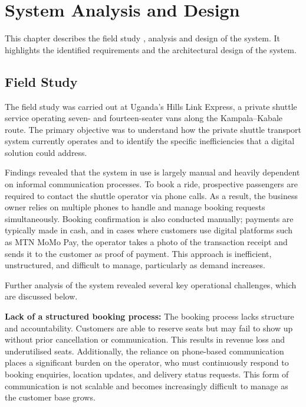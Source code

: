 \chapter{System Analysis and Design}
\label{chap:system_analysis_design}

This chapter describes the field study , analysis and design of the system. It highlights the identified requirements and the architectural design of the system.

\section{Field Study}

The field study was carried out at Uganda's Hills Link Express, a private shuttle service
operating seven- and fourteen-seater vans along the Kampala--Kabale route. The
primary objective was to understand how the private shuttle transport system
currently operates and to identify the specific inefficiencies that a digital
solution could address.



Findings revealed that the system in use is largely manual and heavily dependent
on informal communication processes. To book a ride, prospective passengers are
required to contact the shuttle operator via phone calls. As a result, the
business owner relies on multiple phones to handle and manage booking requests
simultaneously. Booking confirmation is also conducted manually; payments are
typically made in cash, and in cases where customers use digital platforms such
as MTN MoMo Pay, the operator takes a photo of the transaction receipt and sends
it to the customer as proof of payment. This approach is inefficient,
unstructured, and difficult to manage, particularly as demand increases.



Further analysis of the system revealed several key operational challenges,
which are discussed below.


\textbf{Lack of a structured booking process:} The booking process
lacks structure and accountability. Customers are able to reserve seats but may
fail to show up without prior cancellation or communication. This results in
revenue loss and underutilised seats. Additionally, the reliance on phone-based
communication places a significant burden on the operator, who must continuously
respond to booking enquiries, location updates, and delivery status requests.
This form of communication is not scalable and becomes increasingly difficult to
manage as the customer base grows.


